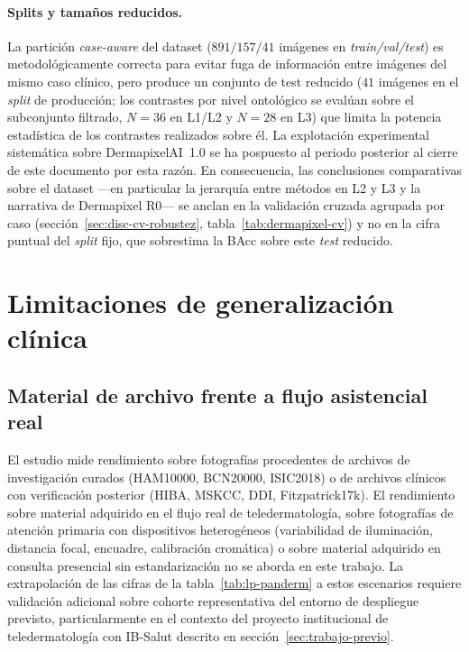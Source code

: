 \paragraph{Splits y tamaños reducidos.}
La partición \emph{case-aware} del dataset
($891 / 157 / 41$ imágenes en \emph{train/val/test}) es
metodológicamente correcta para evitar fuga de información entre
imágenes del mismo caso clínico, pero produce un conjunto de test
reducido ($41$ imágenes en el \emph{split} de producción; los
contrastes por nivel ontológico se evalúan sobre el subconjunto
filtrado, $N = 36$ en L1/L2 y $N = 28$ en L3) que limita la potencia
estadística de los contrastes realizados sobre él. La explotación experimental
sistemática sobre DermapixelAI~1.0 se ha pospuesto al periodo
posterior al cierre de este documento por esta razón. En consecuencia,
las conclusiones comparativas sobre el dataset ---en particular la
jerarquía entre métodos en L2 y L3 y la narrativa de Dermapixel R0---
se anclan en la validación cruzada agrupada por caso
(sección~\ref{sec:disc-cv-robustez}, tabla~\ref{tab:dermapixel-cv}) y
no en la cifra puntual del \emph{split} fijo, que sobrestima la BAcc
sobre este \emph{test} reducido.

\section{Limitaciones de generalización clínica}
\label{sec:lim-clinica}

\subsection{Material de archivo frente a flujo asistencial real}
\label{sec:lim-archivo}

El estudio mide rendimiento sobre fotografías procedentes de
archivos de investigación curados (HAM10000, BCN20000, ISIC2018) o
de archivos clínicos con verificación posterior (HIBA, MSKCC, DDI,
Fitzpatrick17k). El rendimiento sobre material adquirido en el
flujo real de teledermatología, sobre fotografías de atención
primaria con dispositivos heterogéneos (variabilidad de
iluminación, distancia focal, encuadre, calibración cromática) o
sobre material adquirido en consulta presencial sin estandarización
no se aborda en este trabajo. La extrapolación de las cifras de la
tabla~\ref{tab:lp-panderm} a estos escenarios requiere validación
adicional sobre cohorte representativa del entorno de despliegue
previsto, particularmente en el contexto del proyecto institucional
de teledermatología con IB-Salut descrito en
sección~\ref{sec:trabajo-previo}.


